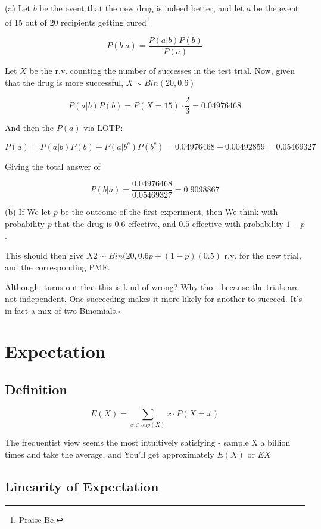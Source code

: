 \documentclass{article}
\newcommand{\qed}{\hfill$\square$}
\begin{document}
			(a) Let $b$ be the event that the new drug is indeed better, and let $a$ be the event of 15 out of 20 recipients getting cured\footnote{Praise Be.}	
			
			$$P(b \vert a) = \frac{P(a \vert b) P(b)}{P(a)}$$
			
			Let $X$ be the r.v. counting the number of successes in the test trial. Now, given that the drug is more successful, $X \sim Bin(20, 0.6)$
			
			$$P(a \vert b) P(b) = P(X = 15)\cdot\frac{2}{3} = 0.04976468$$
			
			And then the $P(a)$ via LOTP:
			
			$$P(a) = P(a\vert b)P(b) + P(a \vert b^c)P(b^c) = 0.04976468 + 0.00492859 = 0.05469327$$
			
			Giving the total answer of 
			
			$$P(b \vert a) = \frac{0.04976468}{0.05469327} = 0.9098867$$
			
			(b) If We let $p$ be the outcome of the first experiment, then We think with probability $p$ that the drug is $0.6$ effective, and $0.5$ effective with probability $1-p$.
			
			This should then give $X2 \sim Bin(20, 0.6p + (1-p)(0.5)$ r.v. for the new trial, and the corresponding PMF.
			
			Although, turns out that this is kind of wrong? Why tho - because the trials are not independent. One succeeding makes it more likely for another to succeed. It's in fact a mix of two Binomials.\qed
			
			\hfill

\newpage
\section{Expectation}

	\subsection{Definition}
	
		$$E(X) = \sum_{x \in sup(X)} x\cdot P(X = x)$$
	
		The frequentist view seems the most intuitively satisfying - sample X a billion times and take the average, and You'll get approximately $E(X)$ or $EX$
	
	\subsection{Linearity of Expectation}
	
\end{document}
